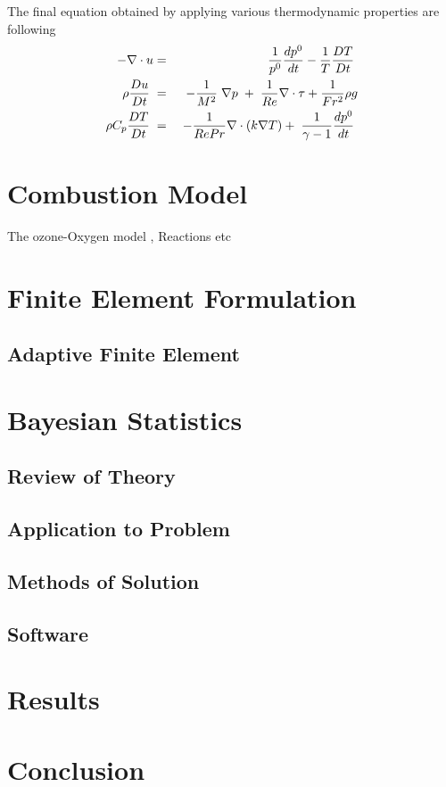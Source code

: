 \documentclass[10pt]{ubthesis}
\begin{document}
The final equation obtained by applying various thermodynamic properties are following
\begin{eqnarray}
-\nabla \cdot u &=& \frac{1}{p^0} \frac{d p^0}{d t} - \frac{1}{T}\frac{D T}{D t} \hspace{1mm}\\
\rho \frac{D u}{D t} \hspace{1mm} &=& -\frac{1}{M^2}\hspace{1mm}\nabla p\hspace{1mm}+\hspace{1mm}\frac{1}{Re}\nabla \cdot \tau + \frac{1}{Fr^2}\rho g \\
\rho C_p \frac{D T}{D t} \hspace{1mm}&=&\hspace{1mm} -  \frac{1}{Re Pr}\nabla\cdot (k \nabla T) + \hspace{1mm} \frac{1}{\gamma -1} \frac{d p^0}{d t}\hspace{1mm}\\
\end{eqnarray}
\chapter{Combustion Model}

The ozone-Oxygen model , Reactions etc
\chapter{Finite Element Formulation}
\section{Adaptive Finite Element}
\chapter{Bayesian Statistics}
\section{Review of Theory}
\section{Application to Problem}
\section{Methods of Solution}
\section{Software}
\chapter{Results}
\chapter{Conclusion}
\begin{ubbackmatter}
\end{ubbackmatter}
\end{document}
